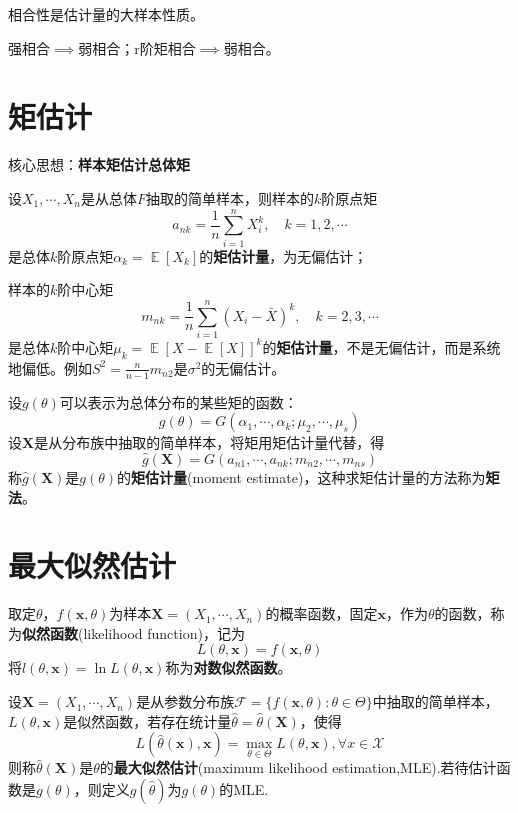 \documentclass{ctexbook}
\DeclareMathOperator{\E}{\mathbb{E}}     %
\begin{document}
相合性是估计量的大样本性质。

强相合$\implies$弱相合；r阶矩相合$\implies$弱相合。

\section{矩估计}

核心思想：\textbf{样本矩估计总体矩}

设$X_1,\cdots,X_n$是从总体$F$抽取的简单样本，则样本的$k$阶原点矩
$$a_{nk}=\frac{1}{n}\sum_{i=1}^n X_i^k,\quad k=1,2,\cdots$$
是总体$k$阶原点矩$\alpha_k=\E[X_k]$的\textbf{矩估计量}，为无偏估计；

样本的$k$阶中心矩
$$m_{nk}=\frac{1}{n}\sum_{i=1}^n (X_i-\bar{X})^k,\quad k=2,3,\cdots$$
是总体$k$阶中心矩$\mu_k=\E[X-\E[X]]^k$的\textbf{矩估计量}，不是无偏估计，而是系统地偏低。例如$S^2=\frac{n}{n-1}m_{n2}$是$\sigma^2$的无偏估计。

\begin{definition}[矩估计]
    设$g(\theta)$可以表示为总体分布的某些矩的函数：
    $$g(\theta)=G(\alpha_1,\cdots,\alpha_k;\mu_2,\cdots,\mu_s)$$
    设$\mathbf{X}$是从分布族中抽取的简单样本，将矩用矩估计量代替，得
    $$\hat{g}(\mathbf{X})=G(a_{n1},\cdots,a_{nk};m_{n2},\cdots,m_{ns})$$
    称$\hat{g}(\mathbf{X})$是$g(\theta)$的\textbf{矩估计量}(moment estimate)，这种求矩估计量的方法称为\textbf{矩法}。
\end{definition}

\section{最大似然估计}

\begin{definition}[似然函数]
    取定$\theta$，$f(\mathbf{x},\theta)$为样本$\mathbf{X}=(X_1,\cdots,X_n)$的概率函数，固定$\mathbf{x}$，作为$\theta$的函数，称为\textbf{似然函数}(likelihood function)，记为
    $$L(\theta,\mathbf{x})=f(\mathbf{x},\theta)$$
    将$l(\theta,\mathbf{x})=\ln L(\theta,\mathbf{x})$称为\textbf{对数似然函数}。
\end{definition}

\begin{definition}[最大似然估计]
    设$\mathbf{X}=(X_1,\cdots,X_n)$是从参数分布族$\mathcal{F}=\{f(\mathbf{x},\theta):\theta\in\Theta\}$中抽取的简单样本，$L(\theta,\mathbf{x})$是似然函数，若存在统计量$\hat{\theta}=\hat{\theta}(\mathbf{X})$，使得
    $$L(\hat{\theta}(\mathbf{x}),\mathbf{x})=\max_{\theta\in\Theta}L(\theta,\mathbf{x}),\forall x\in\mathcal{X} $$
    则称$\hat{\theta}(\mathbf{X})$是$\theta$的\textbf{最大似然估计}(maximum likelihood estimation,MLE).若待估计函数是$g(\theta)$，则定义$g(\hat{\theta})$为$g(\theta)$的MLE.
\end{definition}
\end{document}

